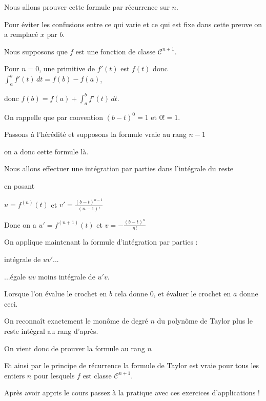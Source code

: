 \change

Nous allons prouver cette formule par récurrence sur $n$.

Pour éviter les confusions entre ce qui varie et ce qui est fixe dans cette
preuve on a remplacé $x$ par $b$.

Nous supposons que $f$ est une fonction de classe $\mathcal{C}^{n+1}$.


\change

Pour $n=0$, une primitive de $f'(t)$ est $f(t)$ donc 
$\int_a^b f'(t) \, dt=f(b)-f(a)$, 

donc $f(b)=f(a)+\int_a^b f'(t) \, dt$. 


On rappelle que par convention $(b-t)^0=1$ et $0!=1$.

\change

Passons à l'hérédité et supposons la formule vraie au rang $n-1$ 

on a donc cette formule là.

\change

Nous allons effectuer une intégration par parties dans l'intégrale du reste

en posant 

$u =f^{(n)}(t)$ et $v' = \frac{(b-t)^{n-1}}{(n-1)!}$

\change

Donc on a $u'= f^{(n+1)}(t)$ et $v = - \frac{(b-t)^{n}}{n!}$

\change 

On applique maintenant la formule d'intégration par parties :

intégrale de $uv'$... 

\change

...égale $uv$ moins intégrale de $u'v$.

\change

Lorsque l'on évalue le crochet en $b$ cela donne $0$,
et évaluer le crochet en $a$ donne ceci.

On reconnaît exactement le monôme de degré $n$ du polynôme de Taylor
plus le reste intégral au rang d'après.


\change

On vient donc de prouver la formule au rang $n$

Et ainsi par le principe de récurrence la formule de Taylor est vraie 
pour tous les entiers $n$ pour lesquels $f$ est classe $\mathcal{C}^{n+1}$.  



\diapo

Après avoir appris le cours passez à la pratique 
avec ces exercices d'applications !


